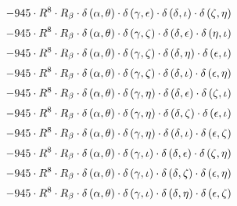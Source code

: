 \begin{subequations}
\begin{gather}
 \\[0.2em] \notag 		 - 945 \cdot R^{8} \cdot R_{\beta{}} \cdot \delta{}\left(\alpha{}, \theta{}\right) \cdot \delta{}\left(\gamma{}, \epsilon{}\right) \cdot \delta{}\left(\delta{}, \iota{}\right) \cdot \delta{}\left(\zeta{}, \eta{}\right) 
 \\[0.2em] \notag 		 - 945 \cdot R^{8} \cdot R_{\beta{}} \cdot \delta{}\left(\alpha{}, \theta{}\right) \cdot \delta{}\left(\gamma{}, \zeta{}\right) \cdot \delta{}\left(\delta{}, \epsilon{}\right) \cdot \delta{}\left(\eta{}, \iota{}\right) 
 \\[0.2em] \notag 		 - 945 \cdot R^{8} \cdot R_{\beta{}} \cdot \delta{}\left(\alpha{}, \theta{}\right) \cdot \delta{}\left(\gamma{}, \zeta{}\right) \cdot \delta{}\left(\delta{}, \eta{}\right) \cdot \delta{}\left(\epsilon{}, \iota{}\right) 
 \\[0.2em] \notag 		 - 945 \cdot R^{8} \cdot R_{\beta{}} \cdot \delta{}\left(\alpha{}, \theta{}\right) \cdot \delta{}\left(\gamma{}, \zeta{}\right) \cdot \delta{}\left(\delta{}, \iota{}\right) \cdot \delta{}\left(\epsilon{}, \eta{}\right) 
 \\[0.2em] \notag 		 - 945 \cdot R^{8} \cdot R_{\beta{}} \cdot \delta{}\left(\alpha{}, \theta{}\right) \cdot \delta{}\left(\gamma{}, \eta{}\right) \cdot \delta{}\left(\delta{}, \epsilon{}\right) \cdot \delta{}\left(\zeta{}, \iota{}\right) 
 \\[0.2em] \notag 		 - 945 \cdot R^{8} \cdot R_{\beta{}} \cdot \delta{}\left(\alpha{}, \theta{}\right) \cdot \delta{}\left(\gamma{}, \eta{}\right) \cdot \delta{}\left(\delta{}, \zeta{}\right) \cdot \delta{}\left(\epsilon{}, \iota{}\right) 
 \\[0.2em] \notag 		 - 945 \cdot R^{8} \cdot R_{\beta{}} \cdot \delta{}\left(\alpha{}, \theta{}\right) \cdot \delta{}\left(\gamma{}, \eta{}\right) \cdot \delta{}\left(\delta{}, \iota{}\right) \cdot \delta{}\left(\epsilon{}, \zeta{}\right) 
 \\[0.2em] \notag 		 - 945 \cdot R^{8} \cdot R_{\beta{}} \cdot \delta{}\left(\alpha{}, \theta{}\right) \cdot \delta{}\left(\gamma{}, \iota{}\right) \cdot \delta{}\left(\delta{}, \epsilon{}\right) \cdot \delta{}\left(\zeta{}, \eta{}\right) 
 \\[0.2em] \notag 		 - 945 \cdot R^{8} \cdot R_{\beta{}} \cdot \delta{}\left(\alpha{}, \theta{}\right) \cdot \delta{}\left(\gamma{}, \iota{}\right) \cdot \delta{}\left(\delta{}, \zeta{}\right) \cdot \delta{}\left(\epsilon{}, \eta{}\right) 
 \\[0.2em] \notag 		 - 945 \cdot R^{8} \cdot R_{\beta{}} \cdot \delta{}\left(\alpha{}, \theta{}\right) \cdot \delta{}\left(\gamma{}, \iota{}\right) \cdot \delta{}\left(\delta{}, \eta{}\right) \cdot \delta{}\left(\epsilon{}, \zeta{}\right) 

\end{gather}
\end{subequations}
